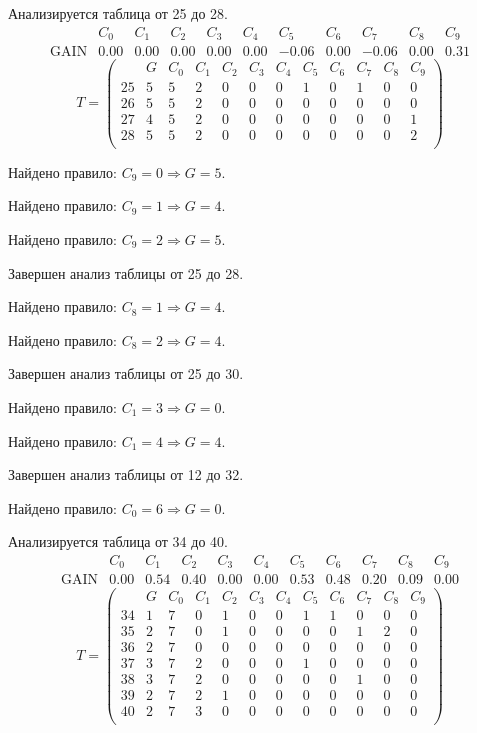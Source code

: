 Анализируется таблица от 25 до 28.
$$ 
\begin{array}{lccccccccc|c|}
	  & C_{0} & C_{1} & C_{2} & C_{3} & C_{4} & C_{5} & C_{6} & C_{7} & C_{8} & C_{9}\\
 \textrm{GAIN} & 0.00 & 0.00 & 0.00 & 0.00 & 0.00 & -0.06 & 0.00 & -0.06 & 0.00 & 0.31
\end{array}
 $$
$$
T = \left( \begin{array}{lcccccccccc|c|}
	 & G & C_{0} & C_{1} & C_{2} & C_{3} & C_{4} & C_{5} & C_{6} & C_{7} & C_{8} & C_{9}\\
	25 & 5 & 5 & 2 & 0 & 0 & 0 & 1 & 0 & 1 & 0 & 0\\
	26 & 5 & 5 & 2 & 0 & 0 & 0 & 0 & 0 & 0 & 0 & 0\\
	27 & 4 & 5 & 2 & 0 & 0 & 0 & 0 & 0 & 0 & 0 & 1\\
	28 & 5 & 5 & 2 & 0 & 0 & 0 & 0 & 0 & 0 & 0 & 2\\
\end{array} \right)
$$

Найдено правило: $C_{9} = 0 \Longrightarrow G = 5$.

Найдено правило: $C_{9} = 1 \Longrightarrow G = 4$.

Найдено правило: $C_{9} = 2 \Longrightarrow G = 5$.

Завершен анализ таблицы от 25 до 28.

Найдено правило: $C_{8} = 1 \Longrightarrow G = 4$.

Найдено правило: $C_{8} = 2 \Longrightarrow G = 4$.

Завершен анализ таблицы от 25 до 30.

Найдено правило: $C_{1} = 3 \Longrightarrow G = 0$.

Найдено правило: $C_{1} = 4 \Longrightarrow G = 4$.

Завершен анализ таблицы от 12 до 32.

Найдено правило: $C_{0} = 6 \Longrightarrow G = 0$.

Анализируется таблица от 34 до 40.
$$ 
\begin{array}{lc|c|cccccccc}
	  & C_{0} & C_{1} & C_{2} & C_{3} & C_{4} & C_{5} & C_{6} & C_{7} & C_{8} & C_{9}\\
 \textrm{GAIN} & 0.00 & 0.54 & 0.40 & 0.00 & 0.00 & 0.53 & 0.48 & 0.20 & 0.09 & 0.00
\end{array}
 $$
$$
T = \left( \begin{array}{lcc|c|cccccccc}
	 & G & C_{0} & C_{1} & C_{2} & C_{3} & C_{4} & C_{5} & C_{6} & C_{7} & C_{8} & C_{9}\\
	34 & 1 & 7 & 0 & 1 & 0 & 0 & 1 & 1 & 0 & 0 & 0\\
	35 & 2 & 7 & 0 & 1 & 0 & 0 & 0 & 0 & 1 & 2 & 0\\
	36 & 2 & 7 & 0 & 0 & 0 & 0 & 0 & 0 & 0 & 0 & 0\\
	37 & 3 & 7 & 2 & 0 & 0 & 0 & 1 & 0 & 0 & 0 & 0\\
	38 & 3 & 7 & 2 & 0 & 0 & 0 & 0 & 0 & 1 & 0 & 0\\
	39 & 2 & 7 & 2 & 1 & 0 & 0 & 0 & 0 & 0 & 0 & 0\\
	40 & 2 & 7 & 3 & 0 & 0 & 0 & 0 & 0 & 0 & 0 & 0\\
\end{array} \right)
$$

